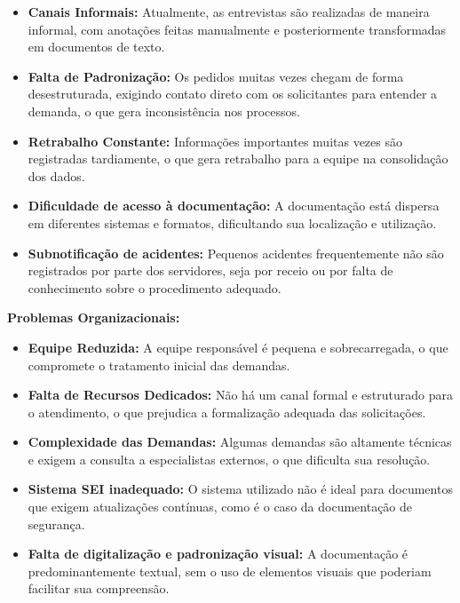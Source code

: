 \documentclass[12pt,a4paper]{article}
\begin{document}
\begin{itemize}
    \item \textbf{Canais Informais:} Atualmente, as entrevistas são realizadas de maneira informal, com anotações feitas manualmente e posteriormente transformadas em documentos de texto.

    \item \textbf{Falta de Padronização:} Os pedidos muitas vezes chegam de forma desestruturada, exigindo contato direto com os solicitantes para entender a demanda, o que gera inconsistência nos processos.

    \item \textbf{Retrabalho Constante:} Informações importantes muitas vezes são registradas tardiamente, o que gera retrabalho para a equipe na consolidação dos dados.

    \item \textbf{Dificuldade de acesso à documentação:} A documentação está dispersa em diferentes sistemas e formatos, dificultando sua localização e utilização.

    \item \textbf{Subnotificação de acidentes:} Pequenos acidentes frequentemente não são registrados por parte dos servidores, seja por receio ou por falta de conhecimento sobre o procedimento adequado.
\end{itemize}

\textbf{Problemas Organizacionais:}

\begin{itemize}
    \item \textbf{Equipe Reduzida:} A equipe responsável é pequena e sobrecarregada, o que compromete o tratamento inicial das demandas.

    \item \textbf{Falta de Recursos Dedicados:} Não há um canal formal e estruturado para o atendimento, o que prejudica a formalização adequada das solicitações.

    \item \textbf{Complexidade das Demandas:} Algumas demandas são altamente técnicas e exigem a consulta a especialistas externos, o que dificulta sua resolução.

    \item \textbf{Sistema SEI inadequado:} O sistema utilizado não é ideal para documentos que exigem atualizações contínuas, como é o caso da documentação de segurança.

    \item \textbf{Falta de digitalização e padronização visual:} A documentação é predominantemente textual, sem o uso de elementos visuais que poderiam facilitar sua compreensão.
\end{itemize}
\end{document}
